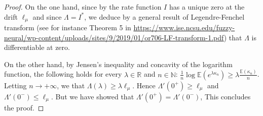 \documentclass[JEP,XML,SOM,Unicode,published]{cedram}
\let\epsilon\varepsilon
\theoremstyle{plain}
\theoremstyle{definition}
\newcommand\E{\mathbb{E}}
\newcommand\R{\mathbb{R}}
\newcommand\N{\mathbb{N}}
\begin{document}
\begin{proof}
On the one hand, since by \cite[Th.\,1.2]{BMSS} the rate function $I$ has a unique zero at the drift $\ell_{\mu}$ and since $\Lambda=I^*$, we deduce by a general result of Legendre-Fenchel transform (see for instance Theorem 5 in \url{https://www.ise.ncsu.edu/fuzzy-neural/wp-content/uploads/sites/9/2019/01/or706-LF-transform-1.pdf}) that $\Lambda$ is differentiable at zero.

On the other hand, by Jensen's inequality and concavity of the logarithm function, the following holds for every $\lambda\in \R$ and $n\in \N$:
$\frac{1}{n}\log \E(e^{\lambda \kappa_n})\geq \lambda \frac{\E(\kappa_n)}{n}$. Letting $n\to +\infty$, we
that $\Lambda(\lambda)\geq \lambda \ell_{\mu}$. Hence $\Lambda'(0^+)\geq \ell_{\mu}$ and $\Lambda'(0^-)\leq \ell_{\mu}$. But we have showed that $\Lambda'(0^+)=\Lambda'(0^-)$, This concludes the proof.

\end{proof}
\end{document}
